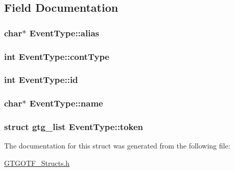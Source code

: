 \subsection{Field Documentation}
\hypertarget{structEventType_a42f50ba031cb2fe4d5bffe085f6ad2c6}{
\subsubsection[{alias}]{\setlength{\rightskip}{0pt plus 5cm}char$\ast$ Event\-Type\-::alias}}\label{structEventType_a42f50ba031cb2fe4d5bffe085f6ad2c6}
\hypertarget{structEventType_afdddbef3fe86529f251fb05fa3445383}{
\subsubsection[{cont\-Type}]{\setlength{\rightskip}{0pt plus 5cm}int Event\-Type\-::cont\-Type}}\label{structEventType_afdddbef3fe86529f251fb05fa3445383}
\hypertarget{structEventType_a29c1aa6026157172fa5c5425105be105}{
\subsubsection[{id}]{\setlength{\rightskip}{0pt plus 5cm}int Event\-Type\-::id}}\label{structEventType_a29c1aa6026157172fa5c5425105be105}
\hypertarget{structEventType_a0c5cf0d1d90a0190925feab828dba2e8}{
\subsubsection[{name}]{\setlength{\rightskip}{0pt plus 5cm}char$\ast$ Event\-Type\-::name}}\label{structEventType_a0c5cf0d1d90a0190925feab828dba2e8}
\hypertarget{structEventType_af6aadf2a0a0a3b8c4d0fe57d4889bbf9}{
\subsubsection[{token}]{\setlength{\rightskip}{0pt plus 5cm}struct {\bf gtg\-\_\-list} Event\-Type\-::token}}\label{structEventType_af6aadf2a0a0a3b8c4d0fe57d4889bbf9}


The documentation for this struct was generated from the following file\-:\begin{DoxyCompactItemize}
\item 
\hyperlink{GTGOTF__Structs_8h}{G\-T\-G\-O\-T\-F\-\_\-\-Structs.\-h}\end{DoxyCompactItemize}
